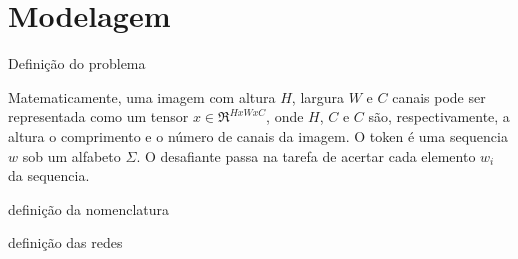 \chapter{Modelagem}

Definição do problema

Matematicamente, uma imagem com altura $H$, largura $W$ e $C$ canais pode ser representada como um tensor $x \in \Re^{H x W x C}$, onde $H$, $C$  e $C$ são, respectivamente, a altura o comprimento e o número de canais da imagem. O token é uma sequencia $w$ sob um alfabeto $\Sigma$. O desafiante passa na tarefa de acertar cada elemento $w_i$ da sequencia.



definição da nomenclatura

definição das redes

